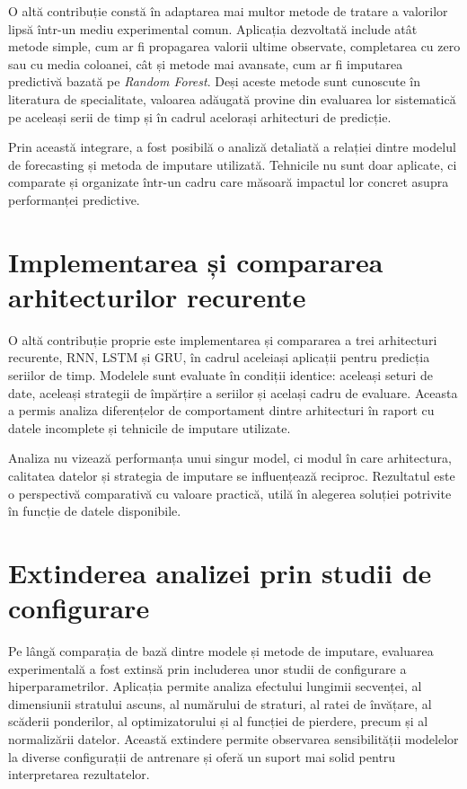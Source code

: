 O altă contribuție constă în adaptarea mai multor metode de tratare a valorilor lipsă într-un mediu experimental comun. Aplicația dezvoltată include atât metode simple, cum ar fi propagarea valorii ultime observate, completarea cu zero sau cu media coloanei, cât și metode mai avansate, cum ar fi imputarea predictivă bazată pe \textit{Random Forest}. Deși aceste metode sunt cunoscute în literatura de specialitate, valoarea adăugată provine din evaluarea lor sistematică pe aceleași serii de timp și în cadrul acelorași arhitecturi de predicție.

Prin această integrare, a fost posibilă o analiză detaliată a relației dintre modelul de forecasting și metoda de imputare utilizată. Tehnicile nu sunt doar aplicate, ci comparate și organizate într-un cadru care măsoară impactul lor concret asupra performanței predictive.

\section{Implementarea și compararea arhitecturilor recurente}

O altă contribuție proprie este implementarea și compararea a trei arhitecturi recurente, RNN, LSTM și GRU, în cadrul aceleiași aplicații pentru predicția seriilor de timp. Modelele sunt evaluate în condiții identice: aceleași seturi de date, aceleași strategii de împărțire a seriilor și același cadru de evaluare. Aceasta a permis analiza diferențelor de comportament dintre arhitecturi în raport cu datele incomplete și tehnicile de imputare utilizate.

Analiza nu vizează performanța unui singur model, ci modul în care arhitectura, calitatea datelor și strategia de imputare se influențează reciproc. Rezultatul este o perspectivă comparativă cu valoare practică, utilă în alegerea soluției potrivite în funcție de datele disponibile.

\section{Extinderea analizei prin studii de configurare}

Pe lângă comparația de bază dintre modele și metode de imputare, evaluarea experimentală a fost extinsă prin includerea unor studii de configurare a hiperparametrilor. Aplicația permite analiza efectului lungimii secvenței, al dimensiunii stratului ascuns, al numărului de straturi, al ratei de învățare, al scăderii ponderilor, al optimizatorului și al funcției de pierdere, precum și al normalizării datelor. Această extindere permite observarea sensibilității modelelor la diverse configurații de antrenare și oferă un suport mai solid pentru interpretarea rezultatelor.

